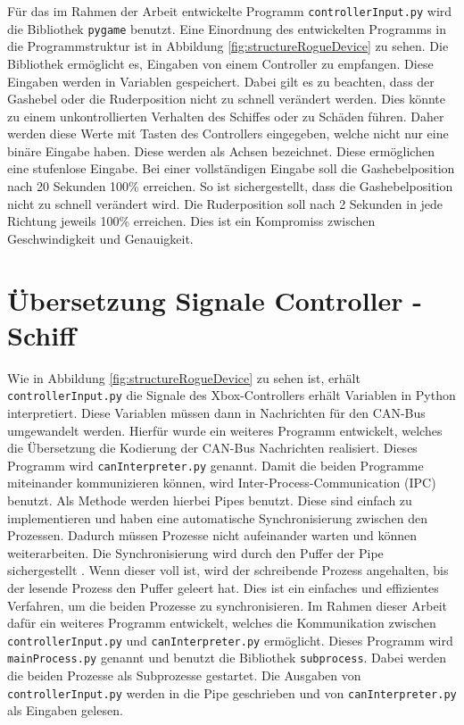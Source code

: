 Für das im Rahmen der Arbeit entwickelte Programm \texttt{controllerInput.py} wird die Bibliothek \texttt{pygame} benutzt.
Eine Einordnung des entwickelten Programms in die Programmstruktur ist in Abbildung \ref{fig:structureRogueDevice} zu sehen.
Die Bibliothek ermöglicht es, Eingaben von einem Controller zu empfangen. Diese Eingaben
werden in Variablen gespeichert. Dabei gilt es zu beachten, dass der Gashebel oder die Ruderposition nicht
zu schnell verändert werden. Dies könnte zu einem unkontrollierten Verhalten des Schiffes oder zu Schäden führen. 
Daher werden diese Werte mit Tasten des
Controllers eingegeben, welche nicht nur eine binäre Eingabe haben. Diese werden als Achsen bezeichnet. Diese ermöglichen
eine stufenlose Eingabe. Bei einer vollständigen Eingabe soll die Gashebelposition nach 20 Sekunden 100\% erreichen.
So ist sichergestellt, dass die Gashebelposition nicht zu schnell verändert wird. Die Ruderposition soll nach 2 Sekunden
in jede Richtung jeweils 100\% erreichen. Dies ist ein Kompromiss zwischen Geschwindigkeit und Genauigkeit.

\section{Übersetzung Signale Controller - Schiff} \label{sec:signalControllerSchiff}

Wie in Abbildung \ref{fig:structureRogueDevice} zu sehen ist, erhält \texttt{controllerInput.py} die Signale des Xbox-Controllers 
erhält Variablen in Python interpretiert.
Diese Variablen müssen
dann in Nachrichten für den CAN-Bus umgewandelt werden. Hierfür wurde ein weiteres Programm entwickelt, welches die Übersetzung die 
Kodierung der CAN-Bus Nachrichten realisiert. Dieses Programm wird \texttt{canInterpreter.py} genannt.
Damit die beiden Programme miteinander kommunizieren
können, wird Inter-Process-Communication (IPC) benutzt. Als Methode werden hierbei Pipes benutzt. Diese sind einfach zu implementieren und haben
eine automatische Synchronisierung zwischen den Prozessen. Dadurch müssen Prozesse nicht aufeinander warten und können weiterarbeiten. 
Die Synchronisierung wird durch den Puffer der Pipe sichergestellt \cite{Venkataraman2015}. 
Wenn dieser voll ist, wird der schreibende Prozess angehalten, bis der
lesende Prozess den Puffer geleert hat. Dies ist ein einfaches und effizientes Verfahren, 
um die beiden Prozesse zu synchronisieren. Im Rahmen dieser Arbeit dafür ein weiteres Programm entwickelt, welches die Kommunikation
zwischen \texttt{controllerInput.py} und \texttt{canInterpreter.py} ermöglicht. Dieses Programm wird \texttt{mainProcess.py} genannt und 
benutzt die Bibliothek \texttt{subprocess}. Dabei werden die beiden Prozesse als Subprozesse gestartet. Die Ausgaben von 
\texttt{controllerInput.py} werden in die Pipe geschrieben und von \texttt{canInterpreter.py} als Eingaben gelesen.

